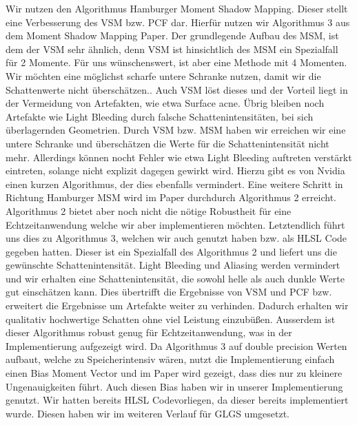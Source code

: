 \documentclass[runningheaders,a4paper]{llncs}
\begin{document}
Wir nutzen den Algorithmus Hamburger Moment Shadow Mapping. Dieser stellt eine Verbesserung des VSM bzw. PCF dar. Hierfür nutzen wir Algorithmus 3 aus dem Moment Shadow Mapping Paper.\cite{msm} Der grundlegende Aufbau des MSM, ist dem der VSM sehr ähnlich, denn VSM ist hinsichtlich des MSM ein Spezialfall für 2 Momente. Für uns wünschenswert, ist aber eine Methode mit 4 Momenten.
Wir möchten eine möglichst scharfe untere Schranke nutzen, damit wir die Schattenwerte nicht überschätzen.\cite{msm}. 
Auch VSM löst dieses und der Vorteil liegt in der Vermeidung von Artefakten, wie etwa Surface acne. Übrig bleiben noch Artefakte wie Light Bleeding durch falsche Schattenintensitäten, bei sich überlagernden Geometrien. Durch VSM bzw. MSM haben wir erreichen wir eine untere Schranke und überschätzen die Werte für die Schattenintensität nicht mehr. Allerdings können nocht Fehler wie etwa Light Bleeding auftreten verstärkt eintreten, solange nicht explizit dagegen gewirkt wird.
Hierzu gibt es von Nvidia einen kurzen Algorithmus, der dies ebenfalls vermindert.\cite{nvidiavsm}
Eine weitere Schritt in Richtung Hamburger MSM wird im Paper durchdurch Algorithmus 2 erreicht.
Algorithmus 2 bietet aber noch nicht die nötige Robustheit für eine Echtzeitanwendung welche wir aber implementieren möchten.\cite{msm}
Letztendlich führt uns dies zu Algorithmus 3, welchen wir auch genutzt haben bzw. als HLSL Code gegeben hatten. Dieser ist ein Spezialfall des Algorithmus 2 und liefert uns die gewünschte Schattenintensität. 
Light Bleeding und Aliasing werden vermindert und wir erhalten eine Schattenintensität, die sowohl helle als auch dunkle Werte gut einschätzen kann. 
Dies übertrifft die Ergebnisse von VSM und PCF bzw. erweitert die Ergebnisse um Artefakte weiter zu verhinden. Dadurch erhalten wir qualitativ hochwertige Schatten ohne viel Leistung einzubüßen. Ausserdem ist dieser Algorithmus robust genug für Echtzeitanwendung, was in der Implementierung aufgezeigt wird. 
Da Algorithmus 3 auf double precision Werten aufbaut, welche zu Speicherintensiv wären, nutzt die Implementierung einfach einen Bias Moment Vector und im Paper wird gezeigt, dass dies nur zu kleinere Ungenauigkeiten führt.\cite{msm} Auch diesen Bias haben wir in unserer Implementierung genutzt. Wir hatten bereits HLSL Codevorliegen, da dieser bereits implementiert wurde. Diesen haben wir im weiteren Verlauf für GLGS umgesetzt.
\end{document}
